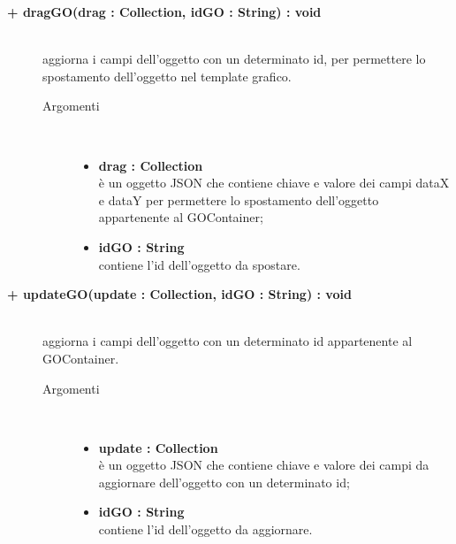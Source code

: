\begin{description}
\begin{description}
\begin{description}
\end{description}

\end{description}

\begin{description}
		\item[\textbf{\color{blue}+ dragGO(drag : Collection, idGO : String) : void			}] \hfill \\
			aggiorna i campi dell'oggetto con un determinato id, per permettere lo spostamento dell'oggetto nel template grafico.    

\begin{description}
			\item[Argomenti] \hfill \\
				\begin{itemize}
					\item \textbf{drag : Collection			} \hfill \\
					è un oggetto JSON che contiene chiave e valore dei campi dataX e dataY per permettere lo spostamento dell'oggetto appartenente al GOContainer;
					\item \textbf{idGO : String			} \hfill \\
					contiene l'id dell'oggetto da spostare.
				\end{itemize}

\end{description}

\end{description}

\begin{description}
		\item[\textbf{\color{blue}+ updateGO(update : Collection, idGO : String) : void			}] \hfill \\
			aggiorna i campi dell'oggetto con un determinato id appartenente al GOContainer.  

\begin{description}
			\item[Argomenti] \hfill \\
				\begin{itemize}
						\item \textbf{update : Collection			} \hfill \\
					è un oggetto JSON che contiene chiave e valore dei campi da aggiornare dell'oggetto con un determinato id;
					\item \textbf{idGO : String			} \hfill \\
					contiene l'id dell'oggetto da aggiornare.
				\end{itemize}

\end{description}

\end{description}


\end{description}

